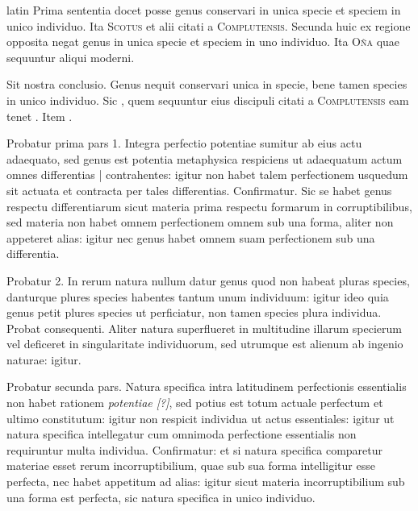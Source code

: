 \begin{otherlanguage*}{latin}
\pstart
 Prima sententia docet posse genus conservari in unica specie et speciem in unico individuo. Ita \textsc{Scotus} et alii citati a \textsc{Complutensis}\index[persons]{}. Secunda huic ex regione opposita negat genus in unica specie et speciem in uno individuo. Ita \textsc{Oña} quae sequuntur aliqui moderni. 
\pend

\pstart
 Sit nostra conclusio. Genus nequit conservari unica in specie, bene tamen species in unico individuo. Sic , quem sequuntur eius discipuli citati a \textsc{Complutensis}\index[persons]{} eam tenet . Item . 
\pend

\pstart
 Probatur prima pars 1. Integra perfectio potentiae sumitur ab eius actu adaequato, sed genus est potentia metaphysica respiciens ut adaequatum actum omnes differentias \textnormal{|}   contrahentes: igitur non habet talem perfectionem usquedum sit actuata et contracta per tales differentias. Confirmatur. Sic se habet genus respectu differentiarum sicut materia prima respectu formarum in corruptibilibus, sed materia non habet omnem perfectionem omnem sub una forma, aliter non appeteret alias: igitur nec genus habet omnem suam perfectionem sub una differentia. 
\pend

\pstart
 Probatur 2. In rerum natura nullum datur genus quod non habeat pluras species, danturque plures species habentes tantum unum individuum: igitur ideo quia genus petit plures species ut perficiatur, non tamen species plura individua. Probat consequenti. Aliter natura superflueret in multitudine illarum specierum vel deficeret in singularitate individuorum, sed utrumque est alienum ab ingenio naturae: igitur. 
\pend

\pstart
 Probatur secunda pars. Natura specifica intra latitudinem perfectionis essentialis non habet rationem \emph{potentiae [?]}, sed potius est totum actuale perfectum et ultimo constitutum: igitur non respicit individua ut actus essentiales: igitur ut natura specifica intellegatur cum omnimoda perfectione essentialis non requiruntur multa individua. Confirmatur: et si natura specifica comparetur materiae esset rerum incorruptibilium, quae sub sua forma intelligitur esse perfecta, nec habet appetitum ad alias: igitur sicut materia incorruptibilium sub una forma est perfecta, sic natura specifica in unico individuo. 
\pend


\end{otherlanguage*}
